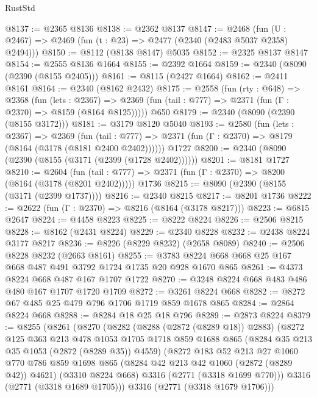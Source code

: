 \begin{lexlean}{RustStd}
\begin{coremodule}
@8137 := @2365 @8136
@8138 := @2362 @8137
@8147 := @2468 (fun (U : @2467) => @2469 (fun (t : @23) => @2477 (@2340 (@2483 @5037 @2358) @2494)))
@8150 := @8112 (@8138 @8147) @5035
@8152 := @2325 @8137 @8147
@8154 := @2555 @8136 @1664
@8155 := @2392 @1664
@8159 := @2340 (@8090 (@2390 (@8155 @2405)))
@8161 := @8115 (@2427 @1664)
@8162 := @2411 @8161
@8164 := @2340 (@8162 @2432)
@8175 := @2558
    (fun (rty : @648) =>
    @2368
      (fun (lets : @2367) =>
      @2369 (fun (tail : @777) => @2371 (fun (Γ : @2370) => @8159 (@8164 @8125)))))
    @650
@8179 := @2340 (@8090 (@2390 (@8155 @3172)))
@8181 := @3179 @8120 @5040
@8193 := @2580
    (fun (lets : @2367) =>
    @2369
      (fun (tail : @777) => @2371 (fun (Γ : @2370) => @8179 (@8164 (@3178 (@8181 @2400 @2402))))))
    @1727
@8200 := @2340 (@8090 (@2390 (@8155 (@3171 (@2399 (@1728 @2402))))))
@8201 := @8181 @1727
@8210 := @2604
    (fun (tail : @777) => @2371 (fun (Γ : @2370) => @8200 (@8164 (@3178 (@8201 @2402)))))
    @1736
@8215 := @8090 (@2390 (@8155 (@3171 (@2399 @1737))))
@8216 := @2340 @8215
@8217 := @8201 @1736
@8222 := @2622 (fun (Γ : @2370) => @8216 (@8164 (@3178 @8217)))
@8223 := @6815 @2647
@8224 := @4458 @8223
@8225 := @8222 @8224
@8226 := @2506 @8215
@8228 := @8162 (@2431 @8224)
@8229 := @2340 @8228
@8232 := @2438 @8224 @3177 @8217
@8236 := @8226 (@8229 @8232) (@2658 @8089)
@8240 := @2506 @8228 @8232 (@2663 @8161)
@8255 := @3783 @8224 @668 @668 @25 @167 @668 @487 @491 @3792 @1724 @1735 @20 @928 @1670 @865
@8261 := @4373 @8224 @668 @487 @167 @1707 @1722
@8270 := @3248 @8224 @668 @483 @486 @480 @167 @1707 @1720 @1709
@8272 := @3261 @8224 @668
@8282 := @8272 @67 @485 @25 @479 @796 @1706 @1719 @859 @1678 @865
@8284 := @2864 @8224 @668
@8288 := @8284 @18 @25 @18 @796
@8289 := @2873 @8224
@8379 := @8255
    (@8261
      (@8270
        (@8282
          (@8288 (@2872 (@8289 @18)) @2883)
          (@8272
            @125
            @363
            @213
            @478
            @1053
            @1705
            @1718
            @859
            @1688
            @865
            (@8284 @35 @213 @35 @1053 (@2872 (@8289 @35)) @4559)
            (@8272
              @183
              @52
              @213
              @27
              @1060
              @770
              @786
              @859
              @1698
              @865
              (@8284 @42 @213 @42 @1060 (@2872 (@8289 @42)) @4621)
              (@3310 @8224 @668)
              @3316
              (@2771 (@3318 @1699 @770)))
            @3316
            (@2771 (@3318 @1689 @1705)))
          @3316
          (@2771 (@3318 @1679 @1706)))

\end{coremodule}
\end{lexlean}
